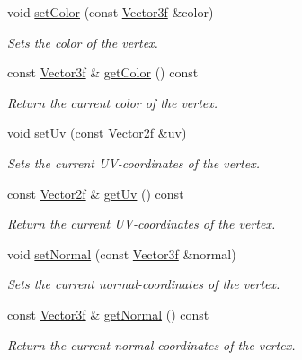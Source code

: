 \begin{DoxyCompactItemize}
void \hyperlink{classburn_1_1_vertex_a57e2bf8a6e58c7d02c8431f03239cc6b}{set\-Color} (const \hyperlink{namespaceburn_afdd7cfb352b9612432faf6947b6fff74}{Vector3f} \&color)
\begin{DoxyCompactList}\small\item\em Sets the color of the vertex. \end{DoxyCompactList}\item 
const \hyperlink{namespaceburn_afdd7cfb352b9612432faf6947b6fff74}{Vector3f} \& \hyperlink{classburn_1_1_vertex_abdf844ed11ecf1befe0a5e876174d1cb}{get\-Color} () const 
\begin{DoxyCompactList}\small\item\em Return the current color of the vertex. \end{DoxyCompactList}\item 
void \hyperlink{classburn_1_1_vertex_afc4eff1b4065852cb856b690006e0bd8}{set\-Uv} (const \hyperlink{namespaceburn_af5ed9eb70cbf0fb572098ff43e146a0a}{Vector2f} \&uv)
\begin{DoxyCompactList}\small\item\em Sets the current U\-V-\/coordinates of the vertex. \end{DoxyCompactList}\item 
const \hyperlink{namespaceburn_af5ed9eb70cbf0fb572098ff43e146a0a}{Vector2f} \& \hyperlink{classburn_1_1_vertex_acff7ab0d3e228c8dba3ce360d4c7d882}{get\-Uv} () const 
\begin{DoxyCompactList}\small\item\em Return the current U\-V-\/coordinates of the vertex. \end{DoxyCompactList}\item 
void \hyperlink{classburn_1_1_vertex_afad866f5f2e1c303fb7cf8902ee7180e}{set\-Normal} (const \hyperlink{namespaceburn_afdd7cfb352b9612432faf6947b6fff74}{Vector3f} \&normal)
\begin{DoxyCompactList}\small\item\em Sets the current normal-\/coordinates of the vertex. \end{DoxyCompactList}\item 
const \hyperlink{namespaceburn_afdd7cfb352b9612432faf6947b6fff74}{Vector3f} \& \hyperlink{classburn_1_1_vertex_acd5b3ab1d798b5020dc75ad4279714ad}{get\-Normal} () const 
\begin{DoxyCompactList}\small\item\em Return the current normal-\/coordinates of the vertex. \end{DoxyCompactList}\end{DoxyCompactItemize}


